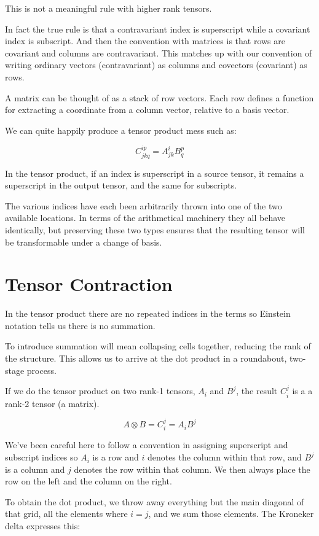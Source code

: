 This is not a meaningful rule with higher rank tensors.

In fact the true rule is that a contravariant index is superscript while a covariant index is subscript. And then the convention with matrices is that rows are covariant and columns are contravariant. This matches up with our convention of writing ordinary vectors (contravariant) as columns and covectors (covariant) as rows.

A matrix can be thought of as a stack of row vectors. Each row defines a function for extracting a coordinate from a column vector, relative to a basis vector.

We can quite happily produce a tensor product mess such as:

$$C^{ip}_{jkq} = A^{i}_{jk}B^{p}_{q}$$

In the tensor product, if an index is superscript in a source tensor, it remains a superscript in the output tensor, and the same for subscripts.

The various indices have each been arbitrarily thrown into one of the two available locations. In terms of the arithmetical machinery they all behave identically, but preserving these two types ensures that the resulting tensor will be transformable under a change of basis.

\section{Tensor Contraction}

In the tensor product there are no repeated indices in the terms so Einstein notation tells us there is no summation.

To introduce summation will mean collapsing cells together, reducing the rank of the structure. This allows us to arrive at the dot product in a roundabout, two-stage process.

If we do the tensor product on two rank-1 tensors, $A_i$ and $B^j$, the result $C^j_i$ is a a rank-2 tensor (a matrix).

$$A \otimes B = C^j_i = A_iB^j$$

We've been careful here to follow a convention in assigning superscript and subscript indices so $A_i$ is a row and $i$ denotes the column within that row, and $B^j$ is a column and $j$ denotes the row within that column. We then always place the row on the left and the column on the right.

To obtain the dot product, we throw away everything but the main diagonal of that grid, all the elements where $i=j$, and we sum those elements. The Kroneker delta expresses this:

